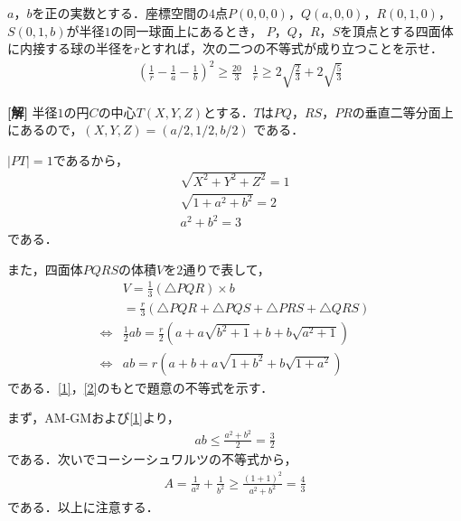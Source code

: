 \documentclass[a4j]{jarticle}
\begin{document}

     \begin{oframed}
     $a$，$b$を正の実数とする．座標空間の$4$点$P(0,0,0)$，$Q(a,0,0)$，$R(0,1,0)$，$S(0,1,b)$が半径$1$の同一球面上にあるとき，
     $P$，$Q$，$R$，$S$を頂点とする四面体に内接する球の半径を$r$とすれば，次の二つの不等式が成り立つことを示せ．
          \begin{align*}
          &\left(\frac{1}{r}-\frac{1}{a}-\frac{1}{b}\right)^2\ge\frac{20}{3}&\frac{1}{r}\ge2\sqrt{\frac{2}{3}}+2\sqrt{\frac{5}{3}}
          \end{align*}
     \end{oframed}

\setlength{\columnseprule}{0.4pt}
\begin{multicols}{2}
{\bf[解]} 半径$1$の円$C$の中心$T(X,Y,Z)$とする．$T$は$PQ$，$RS$，$PR$の垂直二等分面上にあるので，$(X,Y,Z)=(a/2,1/2,b/2)$
である．
    
$|PT|=1$であるから，
     \begin{align}
     \sqrt{X^2+Y^2+Z^2}=1 \nonumber\\
     \sqrt{1+a^2+b^2}=2 \nonumber\\
     a^2+b^2=3\label{1}
     \end{align}
である．

また，四面体$PQRS$の体積$V$を$2$通りで表して，
     \begin{align}
          &V=\frac{1}{3}(\triangle PQR)×b \nonumber\\ 
          &=\frac{r}{3}(\triangle PQR+\triangle PQS+\triangle PRS+\triangle QRS) \nonumber\\
     \Longleftrightarrow
     &\frac{1}{2}ab=\frac{r}{2}(a+a\sqrt{b^2+1}+b+b\sqrt{a^2+1})\nonumber \\
     \Longleftrightarrow
     &ab=r(a+b+a\sqrt{1+b^2}+b\sqrt{1+a^2})\label{2}
     \end{align}     
である．\eqref{1}，\eqref{2}のもとで題意の不等式を示す．

まず，AM-GMおよび\eqref{1}より，
     \begin{align}
     ab\le\frac{a^2+b^2}{2}=\frac{3}{2}\label{3}
     \end{align}
である．次いでコーシーシュワルツの不等式から，
     \begin{align}
     A=\frac{1}{a^2}+\frac{1}{b^2}\ge\frac{(1+1)^2}{a^2+b^2}=\frac{4}{3}\label{4}
     \end{align}
である．以上に注意する．


\end{multicols}
\end{document}
